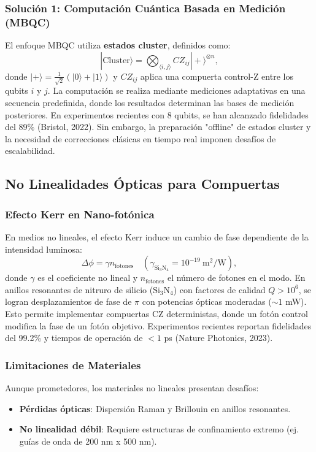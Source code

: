 \documentclass{article}
\begin{document}
\subsubsection*{Solución 1: Computación Cuántica Basada en Medición (MBQC)}

El enfoque MBQC utiliza \textbf{estados cluster}, definidos como:
\[
|\text{Cluster}\rangle = \bigotimes_{\langle i,j \rangle} CZ_{ij} |+\rangle^{\otimes n},
\]
donde $|+\rangle = \frac{1}{\sqrt{2}}(|0\rangle + |1\rangle)$ y $CZ_{ij}$ aplica una compuerta control-Z entre los qubits $i$ y $j$. La computación se realiza mediante mediciones adaptativas en una secuencia predefinida, donde los resultados determinan las bases de medición posteriores. En experimentos recientes con 8 qubits, se han alcanzado fidelidades del 89\% (Bristol, 2022). Sin embargo, la preparación "offline" de estados cluster y la necesidad de correcciones clásicas en tiempo real imponen desafíos de escalabilidad.

\subsection*{No Linealidades Ópticas para Compuertas}

\subsubsection*{Efecto Kerr en Nano-fotónica}

En medios no lineales, el efecto Kerr induce un cambio de fase dependiente de la intensidad luminosa:
\[
\Delta\phi = \gamma n_{\text{fotones}} \quad (\gamma_{\text{Si}_3\text{N}_4} = 10^{-19}\ \text{m}^2/\text{W}),
\]
donde $\gamma$ es el coeficiente no lineal y $n_{\text{fotones}}$ el número de fotones en el modo. En anillos resonantes de nitruro de silicio ($\text{Si}_3\text{N}_4$) con factores de calidad $Q > 10^6$, se logran desplazamientos de fase de $\pi$ con potencias ópticas moderadas ($\sim 1$ mW). Esto permite implementar compuertas CZ deterministas, donde un fotón control modifica la fase de un fotón objetivo. Experimentos recientes reportan fidelidades del 99.2\% y tiempos de operación de $<1$ ps (Nature Photonics, 2023).

\subsubsection*{Limitaciones de Materiales}

Aunque prometedores, los materiales no lineales presentan desafíos:
\begin{itemize}
    \item \textbf{Pérdidas ópticas}: Dispersión Raman y Brillouin en anillos resonantes.
    \item \textbf{No linealidad débil}: Requiere estructuras de confinamiento extremo (ej. guías de onda de 200 nm x 500 nm).
\end{itemize}
\end{document}

